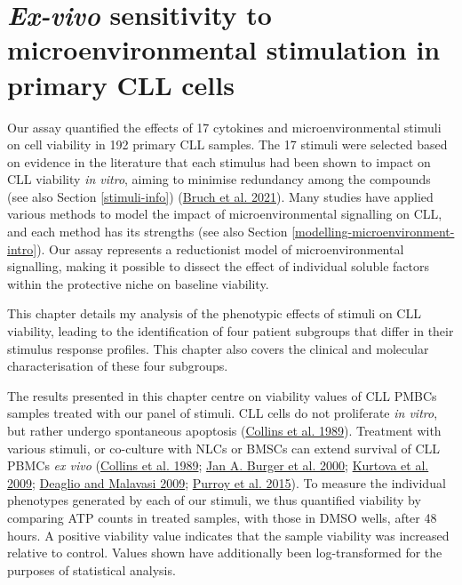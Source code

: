 \documentclass[11pt, a4paper, twosided]{book}
\begin{document}
\hypertarget{chapter4}{%
\chapter{\texorpdfstring{\emph{Ex-vivo} sensitivity to microenvironmental stimulation in primary CLL cells}{Ex-vivo sensitivity to microenvironmental stimulation in primary CLL cells}}\label{chapter4}}

Our assay quantified the effects of 17 cytokines and microenvironmental stimuli on cell viability in 192 primary CLL samples. The 17 stimuli were selected based on evidence in the literature that each stimulus had been shown to impact on CLL viability \emph{in vitro}, aiming to minimise redundancy among the compounds (see also Section \ref{stimuli-info}) (\protect\hyperlink{ref-Giles2021}{Bruch et al. 2021}). Many studies have applied various methods to model the impact of microenvironmental signalling on CLL, and each method has its strengths (see also Section \ref{modelling-microenvironment-intro}). Our assay represents a reductionist model of microenvironmental signalling, making it possible to dissect the effect of individual soluble factors within the protective niche on baseline viability.

This chapter details my analysis of the phenotypic effects of stimuli on CLL viability, leading to the identification of four patient subgroups that differ in their stimulus response profiles. This chapter also covers the clinical and molecular characterisation of these four subgroups.

The results presented in this chapter centre on viability values of CLL PMBCs samples treated with our panel of stimuli. CLL cells do not proliferate \emph{in vitro}, but rather undergo spontaneous apoptosis (\protect\hyperlink{ref-Collins1989}{Collins et al. 1989}). Treatment with various stimuli, or co-culture with NLCs or BMSCs can extend survival of CLL PBMCs \emph{ex vivo} (\protect\hyperlink{ref-Collins1989}{Collins et al. 1989}; \protect\hyperlink{ref-Burger2000}{Jan A. Burger et al. 2000}; \protect\hyperlink{ref-Kurtova2009}{Kurtova et al. 2009}; \protect\hyperlink{ref-Deaglio2009}{Deaglio and Malavasi 2009}; \protect\hyperlink{ref-Purroy2015}{Purroy et al. 2015}). To measure the individual phenotypes generated by each of our stimuli, we thus quantified viability by comparing ATP counts in treated samples, with those in DMSO wells, after 48 hours. A positive viability value indicates that the sample viability was increased relative to control. Values shown have additionally been log-transformed for the purposes of statistical analysis.
\end{document}
